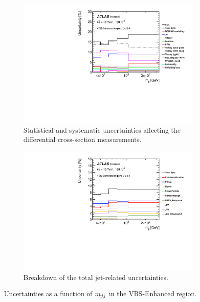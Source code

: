 \begin{figure}[!htb]
    \centering
    \begin{subfigure}{.48\textwidth}
        \centering
        \includegraphics[width=.98\linewidth]{figures/Analysis/Systematics/systematics_VBS_Enhanced.pdf}
        \caption{ Statistical and systematic uncertainties affecting the differential cross-section measurements. \label{fig:sys_mjj_VBS_Enhanced_total}}
    \end{subfigure}
    \begin{subfigure}{.48\textwidth}
        \centering
        \includegraphics[width=.98\linewidth]{figures/Analysis/Systematics/jet_systematics_VBS_Enhanced.pdf}
        \caption{Breakdown of the total jet-related uncertainties. \label{fig:sys_mjj_VBS_Enhanced_jet} }
    \end{subfigure}
    \caption{Uncertainties as a function of $m_{jj}$ in the VBS-Enhanced region. \label{fig:sys_mjj_VBS_Enhanced}}
    \end{figure}